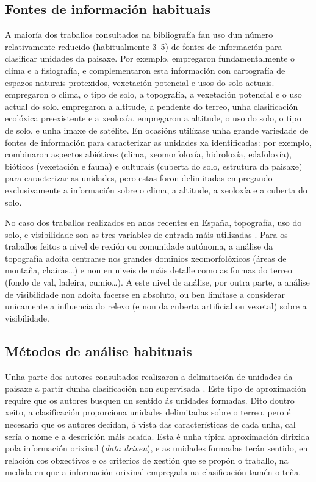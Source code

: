 \documentclass[11pt,a4paper]{article}
\begin{document}
\subsection{Fontes de información habituais}

A maioría dos traballos consultados na bibliografía fan uso dun número relativamente reducido (habitualmente 3--5) de fontes de información para clasificar unidades da paisaxe. Por exemplo, \citet{Capotorti2012174} empregaron fundamentalmente o clima e a fisiografía, e complementaron esta información con cartografía de espazos naturais protexidos, vexetación potencial e usos do solo actuais. \citet{Chuman2010200} empregaron o clima, o tipo de solo, a topografía, a vexetación potencial e o uso actual do solo. \citet{Soto2010720} empregaron a altitude, a pendente do terreo, unha clasificación ecolóxica preexistente e a xeoloxía. \citet{VanEetvelde2009160} empregaron a altitude, o uso do solo, o tipo de solo, e unha imaxe de satélite. En ocasións utilízase unha grande variedade de fontes de información para caracterizar as unidades xa identificadas: por exemplo, \citet{Mucher201087} combinaron aspectos abióticos (clima, xeomorfoloxía, hidroloxía, edafoloxía), bióticos (vexetación e fauna) e culturais (cuberta do solo, estrutura da paisaxe) para caracterizar as unidades, pero estas foron delimitadas empregando exclusivamente a información sobre o clima, a altitude, a xeoloxía e a cuberta do solo.

No caso dos traballos realizados en anos recentes en España, topografía, uso do solo, e visibilidade son as tres variables de entrada máis utilizadas \citep{Valles2013}. Para os traballos feitos a nivel de rexión ou comunidade autónoma, a análise da topografía adoita centrarse nos grandes dominios xeomorfolóxicos (áreas de montaña, chairas\ldots) e non en niveis de máis detalle como as formas do terreo (fondo de val, ladeira, cumio\ldots). A este nivel de análise, por outra parte, a análise de visibilidade non adoita facerse en absoluto, ou ben limítase a considerar unicamente a influencia do relevo (e non da cuberta artificial ou vexetal) sobre a visibilidade.

\subsection{Métodos de análise habituais}

Unha parte dos autores consultados realizaron a delimitación de unidades da paisaxe a partir dunha clasificación non supervisada \citep{VanEetvelde2009160,Chuman2010200,Soto2010720}. Este tipo de aproximación require que os autores busquen un sentido ás unidades formadas. Dito doutro xeito, a clasificación proporciona unidades delimitadas sobre o terreo, pero é necesario que os autores decidan, á vista das características de cada unha, cal sería o nome e a descrición máis acaída. Esta é unha típica aproximación dirixida pola información orixinal (\emph{data driven}), e as unidades formadas terán sentido, en relación cos obxectivos e os criterios de xestión que se propón o traballo, na medida en que a información orixinal empregada na clasificación tamén o teña.
\end{document}
